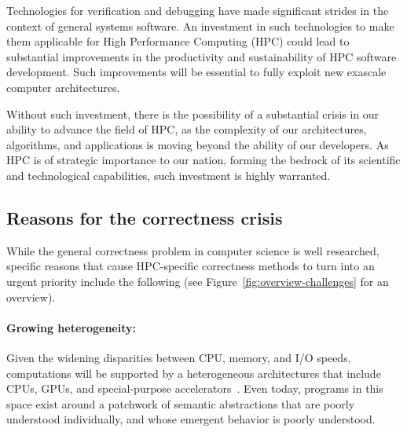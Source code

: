 Technologies for verification and debugging have made significant strides in the context of general systems software. An investment in such technologies to make them applicable for High Performance Computing (HPC) could lead to substantial improvements in the productivity and sustainability of HPC software development. Such improvements will be essential to fully exploit new exascale computer architectures.
  Without such investment, there is the possibility of a substantial crisis in our ability to advance the field of HPC, as the complexity of our architectures, algorithms, and applications is moving beyond the ability of our developers.  As HPC is of strategic importance to our nation, forming the bedrock of its scientific and technological capabilities, such investment is highly warranted.

\subsection{Reasons for the correctness crisis}

While the general correctness problem in computer science is well
researched, specific reasons that cause HPC-specific correctness
methods to turn into an urgent priority include the following (see
Figure~\ref{fig:overview-challenges}
for an overview).

\paragraph{Growing heterogeneity:}

  Given the widening disparities between CPU, memory, and I/O speeds,
  computations will be supported by a heterogeneous architectures that include CPUs, GPUs, and special-purpose accelerators~\cite{hwu-heterogeneity}.
 Even today,
  programs in this space exist around a patchwork of semantic
  abstractions that are poorly understood individually, and
  whose emergent behavior is poorly understood.

